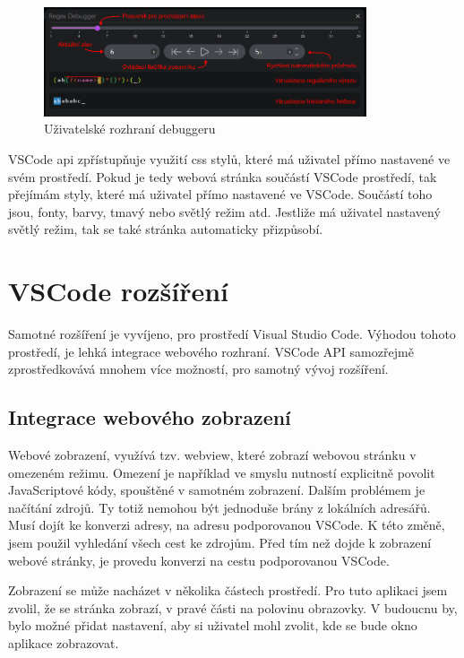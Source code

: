 \begin{figure}[!h]
	\centering
	\includegraphics[width=0.85\textwidth]{Figures/appDebugger.png}
	\caption{Uživatelské rozhraní debuggeru}
	\label{fig:DebuggerUI}
\end{figure}

VSCode api zpřístupňuje využití css stylů, které má uživatel přímo nastavené ve svém prostředí.
Pokud je tedy webová stránka součástí VSCode prostředí, tak přejímám styly, které má uživatel přímo nastavené ve VSCode.
Součástí toho jsou, fonty, barvy, tmavý nebo světlý režim atd.
Jestliže má uživatel nastavený světlý režim, tak se také stránka automaticky přizpůsobí.

\section{VSCode rozšíření}

Samotné rozšíření je vyvíjeno, pro prostředí Visual Studio Code.
Výhodou tohoto prostředí, je lehká integrace webového rozhraní.
VSCode API samozřejmě zprostředkovává mnohem více možností, pro samotný vývoj rozšíření.

\subsection*{Integrace webového zobrazení}

Webové zobrazení, využívá tzv. webview, které zobrazí webovou stránku v omezeném režimu.
Omezení je například ve smyslu nutností explicitně povolit JavaScriptové kódy, spouštěné v samotném zobrazení.
Dalším problémem je načítání zdrojů.
Ty totiž nemohou být jednoduše brány z lokálních adresářů. 
Musí dojít ke konverzi adresy, na adresu podporovanou VSCode. 
K této změně, jsem použil vyhledání všech cest ke zdrojům.
Před tím než dojde k zobrazení webové stránky, je provedu konverzi na cestu podporovanou VSCode.

Zobrazení se může nacházet v několika částech prostředí.
Pro tuto aplikaci jsem zvolil, že se stránka zobrazí, v pravé části na polovinu obrazovky.
V budoucnu by, bylo možné přidat nastavení, aby si uživatel mohl zvolit, kde se bude okno aplikace zobrazovat.

